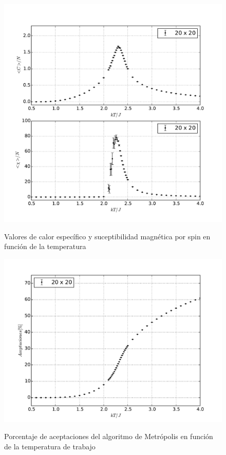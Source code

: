 \documentclass[a4paper,12pt]{article}
\begin{document}
\begin{figure}[H]
    \begin{center}
      \includegraphics[scale=0.6]{fluctuaciones.pdf} \\
      \caption{Valores de calor específico y suceptibilidad magnética por spin 
      en función de la temperatura} \label{fig:fluctuaciones}
    \end{center}
\end{figure}

\begin{figure}[H]
    \begin{center}
      \includegraphics[scale=0.5]{aceptaciones.pdf} \\
      \caption{Porcentaje de aceptaciones del algoritmo de Metrópolis en 
      función de la temperatura de trabajo}\label{fig:aceptaciones}
    \end{center}
\end{figure}
\end{document}
